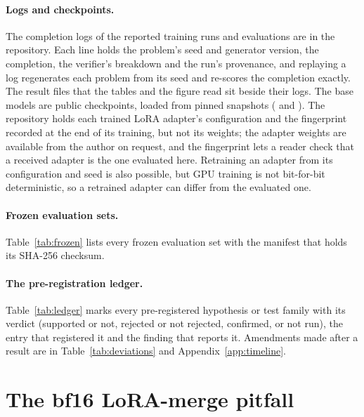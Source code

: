 \paragraph{Logs and checkpoints.}
The completion logs of the reported training runs and evaluations are in the repository.
Each line holds the problem's seed and generator version, the completion, the verifier's breakdown and the run's
provenance, and replaying a log regenerates each problem from its seed and re-scores the completion exactly.
The result files that the tables and the figure read sit beside their logs.
The base models are public checkpoints, loaded from pinned snapshots ( and ).
The repository holds each trained LoRA adapter's configuration and the fingerprint recorded at the end of its
training, but not its weights; the adapter weights are available from the author on request, and the fingerprint
lets a reader check that a received adapter is the one evaluated here.
Retraining an adapter from its configuration and seed is also possible, but GPU training is not bit-for-bit
deterministic, so a retrained adapter can differ from the evaluated one.

\paragraph{Frozen evaluation sets.}
Table~\ref{tab:frozen} lists every frozen evaluation set with the manifest that holds its SHA-256 checksum.

\paragraph{The pre-registration ledger.}
Table~\ref{tab:ledger} marks every pre-registered hypothesis or test family with its verdict (supported or not,
rejected or not rejected, confirmed, or not run), the entry that registered it and the finding that reports it.
Amendments made after a result are in Table~\ref{tab:deviations} and Appendix~\ref{app:timeline}.




\section{The bf16 LoRA-merge pitfall}
\label{app:bf16}


